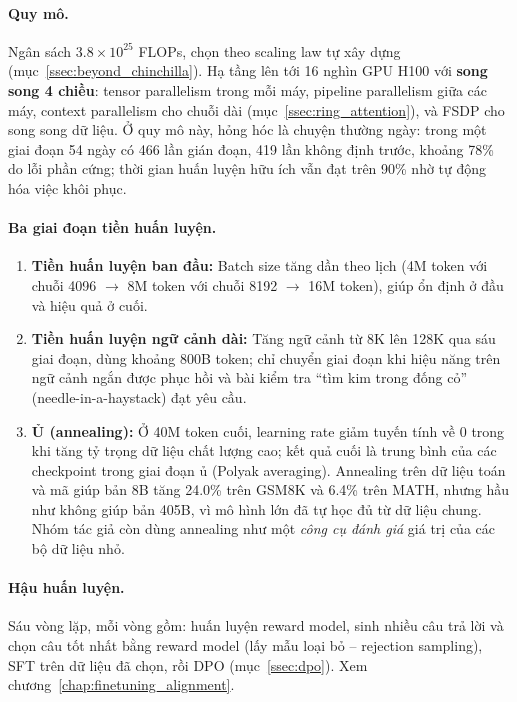 \paragraph{Quy mô.} Ngân sách $3.8 \times 10^{25}$ FLOPs, chọn theo scaling law tự xây dựng (mục~\ref{ssec:beyond_chinchilla}). Hạ tầng lên tới 16 nghìn GPU H100 với \textbf{song song 4 chiều}: tensor parallelism trong mỗi máy, pipeline parallelism giữa các máy, context parallelism cho chuỗi dài (mục~\ref{ssec:ring_attention}), và FSDP cho song song dữ liệu. Ở quy mô này, hỏng hóc là chuyện thường ngày: trong một giai đoạn 54 ngày có 466 lần gián đoạn, 419 lần không định trước, khoảng 78\% do lỗi phần cứng; thời gian huấn luyện hữu ích vẫn đạt trên 90\% nhờ tự động hóa việc khôi phục.

\paragraph{Ba giai đoạn tiền huấn luyện.}
\begin{enumerate}
	\item \textbf{Tiền huấn luyện ban đầu:} Batch size tăng dần theo lịch (4M token với chuỗi 4096 $\rightarrow$ 8M token với chuỗi 8192 $\rightarrow$ 16M token), giúp ổn định ở đầu và hiệu quả ở cuối.
	\item \textbf{Tiền huấn luyện ngữ cảnh dài:} Tăng ngữ cảnh từ 8K lên 128K qua sáu giai đoạn, dùng khoảng 800B token; chỉ chuyển giai đoạn khi hiệu năng trên ngữ cảnh ngắn được phục hồi và bài kiểm tra “tìm kim trong đống cỏ” (needle-in-a-haystack) đạt yêu cầu.
	\item \textbf{Ủ (annealing):} Ở 40M token cuối, learning rate giảm tuyến tính về 0 trong khi tăng tỷ trọng dữ liệu chất lượng cao; kết quả cuối là trung bình của các checkpoint trong giai đoạn ủ (Polyak averaging). Annealing trên dữ liệu toán và mã giúp bản 8B tăng 24.0\% trên GSM8K và 6.4\% trên MATH, nhưng hầu như không giúp bản 405B, vì mô hình lớn đã tự học đủ từ dữ liệu chung. Nhóm tác giả còn dùng annealing như một \emph{công cụ đánh giá} giá trị của các bộ dữ liệu nhỏ.
\end{enumerate}

\paragraph{Hậu huấn luyện.} Sáu vòng lặp, mỗi vòng gồm: huấn luyện reward model, sinh nhiều câu trả lời và chọn câu tốt nhất bằng reward model (lấy mẫu loại bỏ -- rejection sampling), SFT trên dữ liệu đã chọn, rồi DPO (mục~\ref{ssec:dpo}). Xem chương~\ref{chap:finetuning_alignment}.

